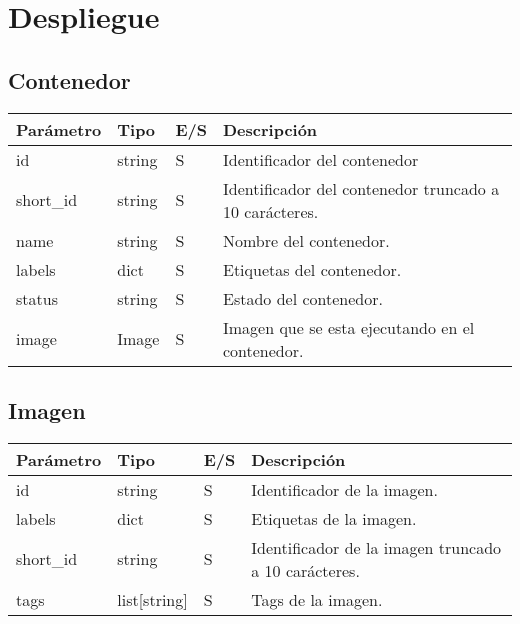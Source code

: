 \section{Despliegue}

	\subsection{Contenedor}
	\label{sec:contenedor}
		\begin{table}[h!]
			\centering
	\begin{adjustbox}{max width=\textwidth}
			\begin{tabularx}{\textwidth}{|l|l|l|L|}
				\hline
				Parámetro & Tipo & E/S & Descripción \\ \hline
				id & string & S & Identificador del contenedor \\ \hline
				short\_id & string & S & Identificador del contenedor truncado a 10 carácteres. \\ \hline
				name & string & S & Nombre del contenedor. \\ \hline
				labels & dict & S & Etiquetas del contenedor. \\ \hline
				status & string & S & Estado del contenedor. \\ \hline
				image & Image & S & Imagen que se esta ejecutando en el contenedor. \\ \hline
			\end{tabularx}
\end{adjustbox}
		\end{table}
	
	\subsection{Imagen}
	\label{sec:imagen}
		\begin{table}[h!]
			\centering
	\begin{adjustbox}{max width=\textwidth}
			\begin{tabularx}{\linewidth}{|l|l|l|L|}
				\hline
				Parámetro & Tipo & E/S & Descripción \\ \hline
				id & string & S & Identificador de la imagen. \\ \hline
				labels & dict & S & Etiquetas de la imagen. \\ \hline
				short\_id & string & S & Identificador de la imagen truncado a 10 carácteres. \\ \hline
				tags & list[string] & S & Tags de la imagen. \\ \hline
			\end{tabularx}
\end{adjustbox}
		\end{table}
	
